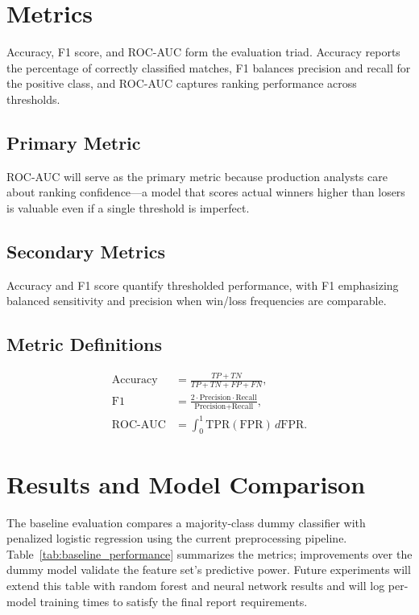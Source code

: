 \documentclass[aps,prl,preprint,groupedaddress]{revtex4-2}
\begin{document}
\section{Metrics}
\label{sec:metrics}

Accuracy, F1 score, and ROC-AUC form the evaluation triad. Accuracy reports the percentage of correctly classified matches, F1 balances precision and recall for the positive class, and ROC-AUC captures ranking performance across thresholds.

\subsection{Primary Metric}
ROC-AUC will serve as the primary metric because production analysts care about ranking confidence---a model that scores actual winners higher than losers is valuable even if a single threshold is imperfect.

\subsection{Secondary Metrics}
Accuracy and F1 score quantify thresholded performance, with F1 emphasizing balanced sensitivity and precision when win/loss frequencies are comparable.

\subsection{Metric Definitions}
\begin{align}
\text{Accuracy} &= \frac{TP + TN}{TP + TN + FP + FN},\\
\text{F1} &= \frac{2 \cdot \text{Precision} \cdot \text{Recall}}{\text{Precision} + \text{Recall}},\\
\text{ROC-AUC} &= \int_{0}^{1} \text{TPR}(\text{FPR})\,d\text{FPR}.
\end{align}

\section{Results and Model Comparison}
\label{sec:results}

The baseline evaluation compares a majority-class dummy classifier with penalized logistic regression using the current preprocessing pipeline. Table~\ref{tab:baseline_performance} summarizes the metrics; improvements over the dummy model validate the feature set's predictive power. Future experiments will extend this table with random forest and neural network results and will log per-model training times to satisfy the final report requirements.
\end{document}
